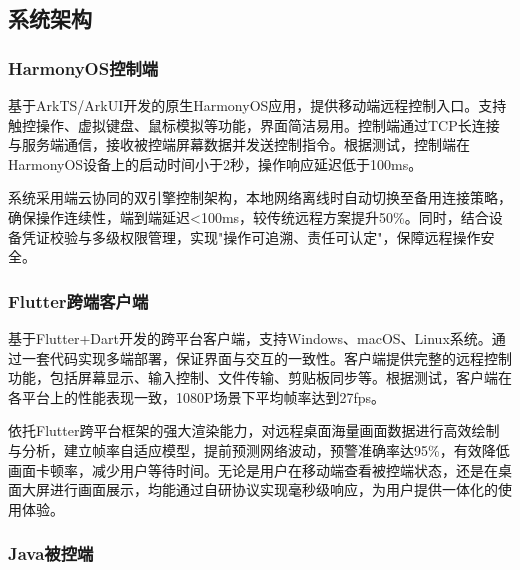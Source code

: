 \documentclass[12pt,a4paper]{article}
\begin{document}
\subsection{系统架构}

\subsubsection{HarmonyOS控制端}

基于ArkTS/ArkUI开发的原生HarmonyOS应用，提供移动端远程控制入口。支持触控操作、虚拟键盘、鼠标模拟等功能，界面简洁易用。控制端通过TCP长连接与服务端通信，接收被控端屏幕数据并发送控制指令。根据测试，控制端在HarmonyOS设备上的启动时间小于2秒，操作响应延迟低于100ms。

系统采用端云协同的双引擎控制架构，本地网络离线时自动切换至备用连接策略，确保操作连续性，端到端延迟<100ms，较传统远程方案提升50\%。同时，结合设备凭证校验与多级权限管理，实现"操作可追溯、责任可认定"，保障远程操作安全。

\subsubsection{Flutter跨端客户端}

基于Flutter+Dart开发的跨平台客户端，支持Windows、macOS、Linux系统。通过一套代码实现多端部署，保证界面与交互的一致性。客户端提供完整的远程控制功能，包括屏幕显示、输入控制、文件传输、剪贴板同步等。根据测试，客户端在各平台上的性能表现一致，1080P场景下平均帧率达到27fps。

依托Flutter跨平台框架的强大渲染能力，对远程桌面海量画面数据进行高效绘制与分析，建立帧率自适应模型，提前预测网络波动，预警准确率达95\%，有效降低画面卡顿率，减少用户等待时间。无论是用户在移动端查看被控端状态，还是在桌面大屏进行画面展示，均能通过自研协议实现毫秒级响应，为用户提供一体化的使用体验。

\subsubsection{Java被控端}
\end{document}
